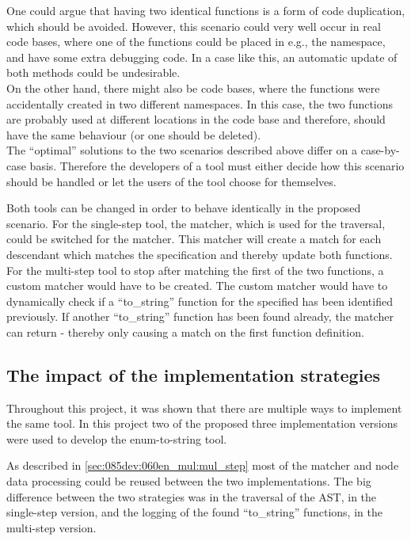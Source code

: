 One could argue that having two identical functions is a form of code duplication, which should be avoided. 
However, this scenario could very well occur in real code bases, where one of the functions could be placed in e.g., the  namespace, and have some extra debugging code. In a case like this, an automatic update of both methods could be undesirable. \\
On the other hand, there might also be code bases, where the functions were accidentally created in two different namespaces. In this case, the two functions are probably used at different locations in the code base and therefore, should have the same behaviour (or one should be deleted).\\
The ``optimal'' solutions to the two scenarios described above differ on a case-by-case basis. Therefore the developers of a tool must either decide how this scenario should be handled or let the users of the tool choose for themselves.

Both tools can be changed in order to behave identically in the proposed scenario. For the single-step tool, the  matcher, which is used for the traversal, could be switched for the  matcher. This matcher will create a match for each descendant which matches the specification and thereby update both functions.\\
For the multi-step tool to stop after matching the first of the two functions, a custom matcher would have to be created. The custom matcher would have to dynamically check if a ``to\_string'' function for the specified  has been identified previously. If another ``to\_string'' function has been found already, the matcher can return  - thereby only causing a match on the first function definition.


\subsection{The impact of the implementation strategies}

Throughout this project, it was shown that there are multiple ways to implement the same tool. In this project two of the proposed three implementation versions were used to develop the enum-to-string tool. 

As described in \cref{sec:085dev:060en_mul:mul_step} most of the matcher and node data processing could be reused between the two implementations. The big difference between the two strategies was in the traversal of the AST, in the single-step version, and the logging of the found ``to\_string'' functions, in the multi-step version.


